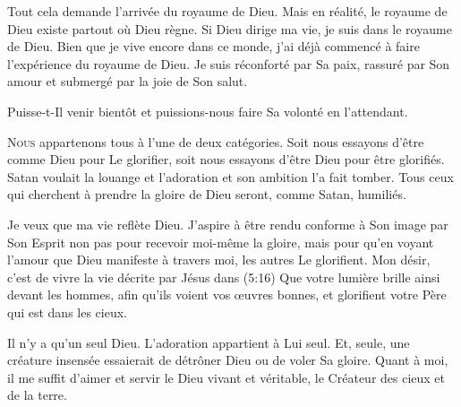 Tout cela demande l'arrivée du royaume de Dieu.
 Mais en réalité, le royaume de Dieu existe partout où Dieu règne.
 Si Dieu dirige ma vie, je suis dans le royaume de Dieu.
 Bien que je vive encore dans ce monde, j'ai déjà commencé à faire
 l'expérience du royaume de Dieu. Je suis réconforté par Sa paix,
 rassuré par Son amour et submergé par la joie de Son salut. 

Puisse-t-Il venir bientôt
 \ocadr et puissions-nous faire Sa volonté en l'attendant. 

\dvrule






\lettrine{N}{ous} appartenons tous à l'une de deux catégories.
 Soit nous essayons d'être comme Dieu pour Le glorifier,
 soit nous essayons d'être Dieu pour être glorifiés.
 Satan voulait la louange et l'adoration
 \ocadr et son ambition l'a fait tomber.
 Tous ceux qui cherchent à prendre la gloire de Dieu seront,
 comme Satan, humiliés. 


Je veux que ma vie reflète Dieu. J'aspire à être rendu conforme
 à Son image par Son Esprit \ocadr non pas pour recevoir moi-même la gloire,
 mais pour qu'en voyant l'amour que Dieu manifeste à travers moi,
 les autres Le glorifient.
 Mon désir, c'est de vivre la vie décrite par Jésus
 dans (5:16)\frcolon{}
 \Og Que votre lumière brille ainsi devant les hommes,
 afin qu'ils voient vos \oe{}uvres bonnes,
 et glorifient votre Père qui est dans les cieux. \Fg{}

Il n'y a qu'un seul Dieu. L'adoration appartient à Lui seul.
 Et, seule, 
 une créature insensée essaierait de détrôner Dieu ou de voler Sa gloire.
 Quant à moi, il me suffit d'aimer et servir le Dieu vivant et véritable,
 le Créateur des cieux et de la terre. 

